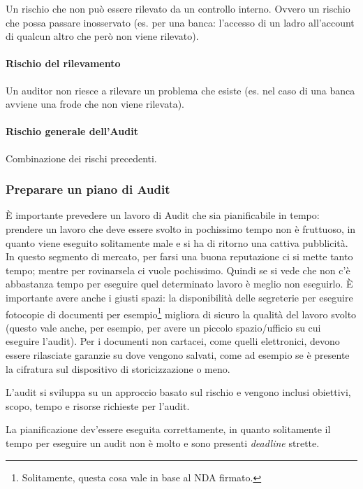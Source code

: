 Un rischio che non può essere rilevato da un controllo interno. Ovvero un
rischio che possa passare inosservato (es. per una banca: l'accesso di un ladro
all'account di qualcun altro che però non viene rilevato).


\paragraph*{Rischio del rilevamento}

Un auditor non riesce a rilevare un problema che esiste (es. nel caso
di una banca avviene una frode che non viene rilevata).

\paragraph*{Rischio generale dell'Audit}

Combinazione dei rischi precedenti.


\subsubsection{Preparare un piano di Audit}

È importante prevedere un lavoro di Audit che sia pianificabile in tempo:
prendere un lavoro che deve essere svolto in pochissimo tempo non è
fruttuoso, in quanto viene eseguito solitamente male e si ha di
ritorno una cattiva pubblicità. In questo segmento di mercato, per farsi una
buona reputazione ci si mette tanto tempo; mentre per rovinarsela ci vuole
pochissimo.
Quindi se si vede che non c'è abbastanza tempo per eseguire quel determinato
lavoro è meglio non eseguirlo.
È importante avere anche i giusti spazi: la disponibilità delle segreterie per
eseguire fotocopie di documenti per esempio\footnote{Solitamente, questa cosa
vale in base al NDA firmato.} migliora di sicuro la qualità del lavoro svolto
(questo vale anche, per esempio, per avere un piccolo spazio/ufficio su cui
eseguire l'audit). Per i documenti non cartacei, come quelli elettronici,
devono essere rilasciate garanzie su dove vengono salvati, come ad esempio se è
presente la cifratura sul dispositivo di storicizzazione o meno.

L'audit si sviluppa su un approccio basato sul rischio e vengono inclusi
obiettivi, scopo, tempo e risorse richieste per l'audit.

La pianificazione dev'essere eseguita correttamente, in quanto solitamente il
tempo per eseguire un audit non è molto e sono presenti \textit{deadline}
strette.

